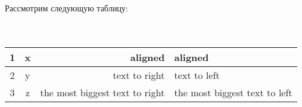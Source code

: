 \documentclass[a4paper, 12pt]{article}
\begin{document}
    Рассмотрим следующую таблицу:\\
    \\ %
    \\ %
    \centering \begin{tabular}{||c|c|||r|l||} %
        \hline %
        1 & x & aligned & aligned \\ %
        \hline %
        2 & y & text to right & text to left \\
        \cline{2-3} %
        3 & z & the most biggest text to right & the most biggest text to left \\
        \hline %
    \end{tabular}
\end{document}
